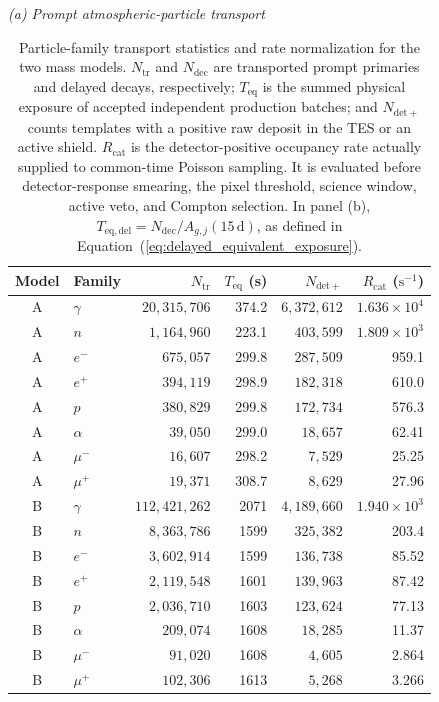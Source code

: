 \documentclass[11pt]{article}
\begin{document}
\begin{table}[!htbp]

\centering

\caption{Particle-family transport statistics and rate
normalization for the two mass models. $N_{\mathrm{tr}}$ and $N_{\mathrm{dec}}$
are transported prompt primaries and delayed decays, respectively;
$T_{\mathrm{eq}}$ is the summed physical exposure of accepted independent
production batches; and $N_{\mathrm{det+}}$ counts templates with a positive
raw deposit in the TES or an active shield. $R_{\mathrm{cat}}$ is the
detector-positive occupancy rate actually supplied to common-time Poisson
sampling. It is evaluated before detector-response smearing, the pixel
threshold, science window, active veto, and Compton selection. In panel (b),
$T_{\mathrm{eq,del}}=N_{\mathrm{dec}}/A_{g,j}(15\,\mathrm d)$, as defined in
Equation~(\ref{eq:delayed_equivalent_exposure}).}
\label{tab:background_source_model}
\scriptsize
\setlength{\tabcolsep}{5.0pt}
\renewcommand{\arraystretch}{0.92}
\noindent\textit{(a) Prompt atmospheric-particle transport}\par\vspace{0.20em}
\begin{tabular}{clrrrr}
\toprule
Model & Family & $N_{\mathrm{tr}}$ & $T_{\mathrm{eq}}$ (s)
& $N_{\mathrm{det+}}$ & $R_{\mathrm{cat}}$ ($\mathrm{s^{-1}}$) \\
\midrule
A & $\gamma$ & $20{,}315{,}706$ & 374.2 & $6{,}372{,}612$ & $1.636\times10^{4}$ \\
A & $n$ & $1{,}164{,}960$ & 223.1 & $403{,}599$ & $1.809\times10^{3}$ \\
A & $e^-$ & $675{,}057$ & 299.8 & $287{,}509$ & 959.1 \\
A & $e^+$ & $394{,}119$ & 298.9 & $182{,}318$ & 610.0 \\
A & $p$ & $380{,}829$ & 299.8 & $172{,}734$ & 576.3 \\
A & $\alpha$ & $39{,}050$ & 299.0 & $18{,}657$ & 62.41 \\
A & $\mu^-$ & $16{,}607$ & 298.2 & $7{,}529$ & 25.25 \\
A & $\mu^+$ & $19{,}371$ & 308.7 & $8{,}629$ & 27.96 \\
\addlinespace[0.25em]
B & $\gamma$ & $112{,}421{,}262$ & 2071 & $4{,}189{,}660$ & $1.940\times10^{3}$ \\
B & $n$ & $8{,}363{,}786$ & 1599 & $325{,}382$ & 203.4 \\
B & $e^-$ & $3{,}602{,}914$ & 1599 & $136{,}738$ & 85.52 \\
B & $e^+$ & $2{,}119{,}548$ & 1601 & $139{,}963$ & 87.42 \\
B & $p$ & $2{,}036{,}710$ & 1603 & $123{,}624$ & 77.13 \\
B & $\alpha$ & $209{,}074$ & 1608 & $18{,}285$ & 11.37 \\
B & $\mu^-$ & $91{,}020$ & 1608 & $4{,}605$ & 2.864 \\
B & $\mu^+$ & $102{,}306$ & 1613 & $5{,}268$ & 3.266 \\
\bottomrule
\end{tabular}


\end{table}
\end{document}
